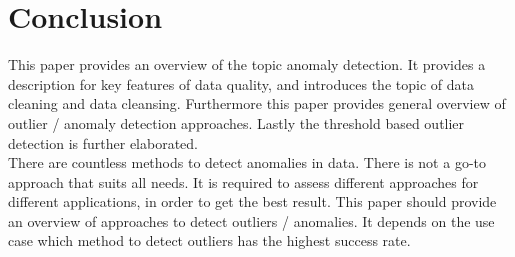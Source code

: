 \chapter{Conclusion}
This paper provides an overview of the topic anomaly detection. It provides a description for key features of data quality, and introduces the topic of data cleaning and data cleansing. Furthermore this paper provides general overview of outlier / anomaly detection approaches. Lastly the threshold based outlier detection is further elaborated.\\
There are countless methods to detect anomalies in data. There is not a go-to approach that suits all needs. It is required to assess different approaches for different applications, in order to get the best result. This paper should provide an overview of approaches to detect outliers / anomalies. It depends on the use case which method to detect outliers has the highest success rate.  